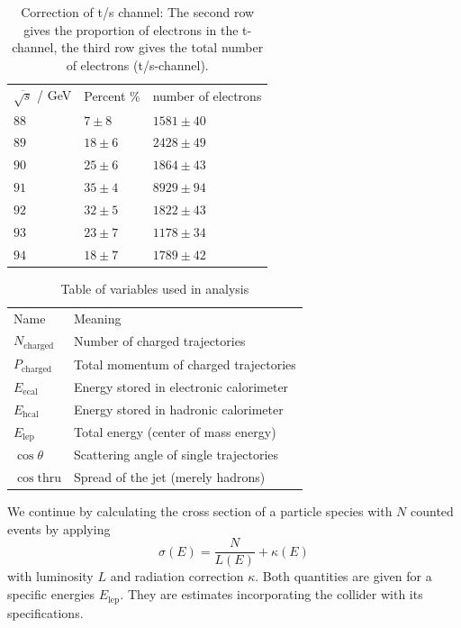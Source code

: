 \begin{table}[htpb]
    \centering
    \caption{Correction of t/s channel: The second row gives the proportion of electrons in the t-channel,
    the third row gives the total number of electrons (t/s-channel).}
    \label{tab:table_ts}
    \begin{tabular}{l|l|l}
        \rowcolor{LightCyan} $\overline{\sqrt{s}}$ / GeV & Percent \% & number of electrons \\
        $88$ & $7  \pm  8$  & $1581 \pm 40$ \\
        $89$ & $18 \pm  6$  & $2428 \pm 49$ \\
        $90$ & $25 \pm  6$  & $1864 \pm 43$ \\
        $91$ & $35 \pm  4$  & $8929 \pm 94$ \\
        $92$ & $32 \pm  5$  & $1822 \pm 43$ \\
        $93$ & $23 \pm  7$  & $1178 \pm 34$ \\
        $94$ & $18 \pm  7$  & $1789 \pm 42$ 
    \end{tabular}
\end{table}


\begin{table}[htpb]
    \centering
    \caption{Table of variables used in analysis}
    \label{tab:vars}
    \begin{tabular}{l|l}
  \rowcolor{LightCyan} Name & Meaning \\ 
    $N_{\mathrm{charged} }$ & Number of charged trajectories \\
    $P_{\mathrm{charged} }$ & Total momentum of charged trajectories \\
    $E_{\mathrm{ecal}}$ & Energy stored in electronic calorimeter \\
    $E_{\mathrm{hcal}}$ & Energy stored in hadronic calorimeter \\
    $E_{\mathrm{lep}}$ & Total energy (center of mass energy) \\
    $\cos\theta$ & Scattering angle of single trajectories \\
    $\cos\mathrm{thru} $ & Spread of the jet (merely hadrons)\\
    \end{tabular}
\end{table}

We continue by calculating the cross section of a particle species with $N$ counted events by applying  
\begin{equation}
    \sigma(E) = \frac{N}{L(E)} + \kappa(E)
\end{equation}
with luminosity $L$ and radiation correction $\kappa$. Both quantities are given for a specific energies $E_\mathrm{lep}$. 
They are estimates incorporating the collider with its specifications.
